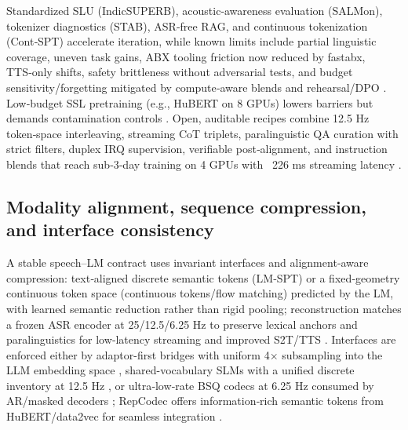\documentclass{article}
\begin{document}
Standardized SLU (IndicSUPERB), acoustic‑awareness evaluation (SALMon), tokenizer diagnostics (STAB), ASR‑free RAG, and continuous tokenization (Cont‑SPT) accelerate iteration, while known limits include partial linguistic coverage, uneven task gains, ABX tooling friction now reduced by fastabx, TTS‑only shifts, safety brittleness without adversarial tests, and budget sensitivity/forgetting mitigated by compute‑aware blends and rehearsal/DPO \cite{entry2025indicsuperbspeechprocessinguniversalperf,maimon2025salmonsuiteacousticlanguagemodelevaluati,vashishth2024stabspeechtokenizerassessmentbenchmark,min2025speechretrievalaugmentedgenerationwithou,li2025continuousspeechtokenizertext,poli2025fastabxlibraryefficientcomputationabxdis,wang2023slmbridgethingapbetweenspeechtextfoundat,maimon2025slammingtrainingspeechlanguagemodelonegp}. Low‑budget SSL pretraining (e.g., HuBERT on 8 GPUs) lowers barriers but demands contamination controls \cite{chen2023reducingbarriersselfsupervisedlearninghu,tseng2025evaluationllmsspeechisoftenflawedtestset}. Open, auditable recipes combine 12.5 Hz token‑space interleaving, streaming CoT triplets, paralinguistic QA curation with strict filters, duplex IRQ supervision, verifiable post‑alignment, and instruction blends that reach sub‑3‑day training on 4 GPUs with ~226 ms streaming latency \cite{zeng2024scalingspeechtextpretrainingsyntheticint,guo2025streamuniachievingstreamingspeechtransla,wang2025incorporatingcontextualparalinguisticund,ma2024languagemodelcanlistenwhilespeaking,li2025seewossubmissionmlcslmlessonslearnedspee,peng2025voicetextblenderaugmentinglargelanguagem,fang2025llamaomniseamlessspeechinteractionlargel,maimon2025slammingtrainingspeechlanguagemodelonegp,lu2025desta2developinginstructionfollowingspee}.

\subsection{Modality alignment, sequence compression, and interface consistency} \label{subsec:Modality alignment, sequence compression, and interface consistency}
A stable speech–LM contract uses invariant interfaces and alignment‑aware compression: text‑aligned discrete semantic tokens (LM‑SPT) or a fixed‑geometry continuous token space (continuous tokens/flow matching) predicted by the LM, with learned semantic reduction rather than rigid pooling; reconstruction matches a frozen ASR encoder at 25/12.5/6.25 Hz to preserve lexical anchors and paralinguistics for low‑latency streaming and improved S2T/TTS \cite{jo2025lmsptalignedsemanticdistillationspeechto,yuan2024continuousspeechtokensmakesllmsrobustmul}. Interfaces are enforced either by adaptor-first bridges with uniform 4× subsampling into the LLM embedding space \cite{wang2023slmbridgethingapbetweenspeechtextfoundat}, shared-vocabulary SLMs with a unified discrete inventory at 12.5 Hz \cite{zeng2024scalingspeechtextpretrainingsyntheticint}, or ultra‑low‑rate BSQ codecs at 6.25 Hz consumed by AR/masked decoders \cite{wang2025tadicodectextawarediffusionspeechtokeniz}; RepCodec offers information‑rich semantic tokens from HuBERT/data2vec for seamless integration \cite{huang2024repcodecspeechrepresentationcodectokeniz}.
\end{document}
